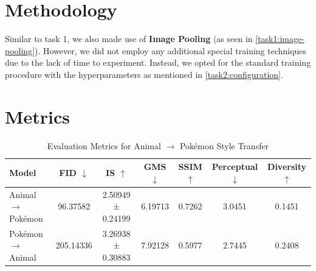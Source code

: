 \documentclass[twoside,english,notitlepage]{report}
\begin{document}
\section{Methodology}
Similar to task 1, we also made use of \textbf{Image Pooling} (as seen in \ref{task1:image-pooling}). However, we did not employ any additional special training techniques due to the lack of time to experiment. Instead, we opted for the standard training procedure with the hyperparameters as mentioned in \ref{task2:configuration}.

\section{Metrics}\label{task2:metrics}

\begin{table}[h]
    \centering
    \caption{Evaluation Metrics for Animal $\rightarrow$ Pokémon Style Transfer}
    \begin{tabular}{lcccccc}
        \hline
        \textbf{Model} & 
        \textbf{FID} $\downarrow$ & 
        \textbf{IS} $\uparrow$ & 
        \textbf{GMS} $\downarrow$ & 
        \textbf{SSIM} $\uparrow$ & 
        \textbf{Perceptual} $\downarrow$ & 
        \textbf{Diversity} $\uparrow$ \\
        \hline
        Animal $\rightarrow$ Pokémon    & 96.37582 & 2.50949 ± 0.24199 & 6.19713 & 0.7262 & 3.0451 & 0.1451 \\
        Pokémon $\rightarrow$ Animal       & 205.14336 & 3.26938 ± 0.30883 & 7.92128 & 0.5977 & 2.7445 & 0.2408 \\
        \hline
    \end{tabular}
    \label{tab:metrics}
\end{table}
\end{document}
